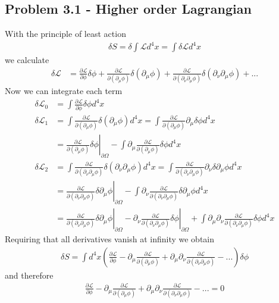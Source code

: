 \documentclass[../main.tex]{subfiles}
\begin{document}
\subsection{Problem 3.1 - Higher order Lagrangian}
With the principle of least action
\begin{align}
\delta S=\delta\int\mathcal{L}d^4x=\int\delta\mathcal{L}d^4x
\end{align}
we calculate
\begin{align}
\delta\mathcal{L}
&=\frac{\partial \mathcal{L}}{\partial\phi}\delta\phi+
\frac{\partial \mathcal{L}}{\partial(\partial_\mu\phi)}\delta(\partial_\mu\phi)+
\frac{\partial \mathcal{L}}{\partial(\partial_\nu\partial_\mu\phi)}\delta(\partial_\nu\partial_\mu\phi)+...
\end{align}
Now we can integrate each term
\begin{align}
\delta\mathcal{L}_0&=\int \frac{\partial \mathcal{L}}{\partial\phi}\delta\phi d^4x\\
%
\delta\mathcal{L}_1&=\int \frac{\partial \mathcal{L}}{\partial(\partial_\mu\phi)}\delta(\partial_\mu\phi) d^4x
=\int \frac{\partial \mathcal{L}}{\partial(\partial_\mu\phi)}\partial_\mu\delta\phi d^4x\\
&=\left.\frac{\partial \mathcal{L}}{\partial(\partial_\mu\phi)}\delta\phi\right|_{\partial\Omega}-\int \partial_\mu\frac{\partial \mathcal{L}}{\partial(\partial_\mu\phi)}\delta\phi d^4x\\
%
\delta\mathcal{L}_2&=\int \frac{\partial \mathcal{L}}{\partial(\partial_\nu\partial_\mu\phi)}\delta(\partial_\nu\partial_\mu\phi) d^4x
=\int \frac{\partial \mathcal{L}}{\partial(\partial_\nu\partial_\mu\phi)}\partial_\nu\delta\partial_\mu\phi d^4x\\
&=\left.\frac{\partial \mathcal{L}}{\partial(\partial_\nu\partial_\mu\phi)}\delta\partial_\mu\phi\right|_{\partial\Omega}-\int \partial_\nu\frac{\partial \mathcal{L}}{\partial(\partial_\nu\partial_\mu\phi)}\delta\partial_\mu\phi d^4x\\
&=\left.\frac{\partial \mathcal{L}}{\partial(\partial_\nu\partial_\mu\phi)}\delta\partial_\mu\phi\right|_{\partial\Omega}-\left.\partial_\nu\frac{\partial \mathcal{L}}{\partial(\partial_\nu\partial_\mu\phi)}\delta\phi\right|_{\partial\Omega}+\int \partial_\mu\partial_\nu\frac{\partial \mathcal{L}}{\partial(\partial_\nu\partial_\mu\phi)}\delta\phi d^4x
\end{align}
Requiring that all derivatives vanish at infinity we obtain
\begin{align}
\delta S=\int d^4x\left(
\frac{\partial \mathcal{L}}{\partial\phi}
- \partial_\mu\frac{\partial \mathcal{L}}{\partial(\partial_\mu\phi)}
+\partial_\mu\partial_\nu\frac{\partial \mathcal{L}}{\partial(\partial_\nu\partial_\mu\phi)}-...
\right)\delta\phi
\end{align}
and therefore
\begin{align}
\frac{\partial \mathcal{L}}{\partial\phi}
- \partial_\mu\frac{\partial \mathcal{L}}{\partial(\partial_\mu\phi)}
+\partial_\mu\partial_\nu\frac{\partial \mathcal{L}}{\partial(\partial_\nu\partial_\mu\phi)}-...=0
\end{align}
\end{document}
